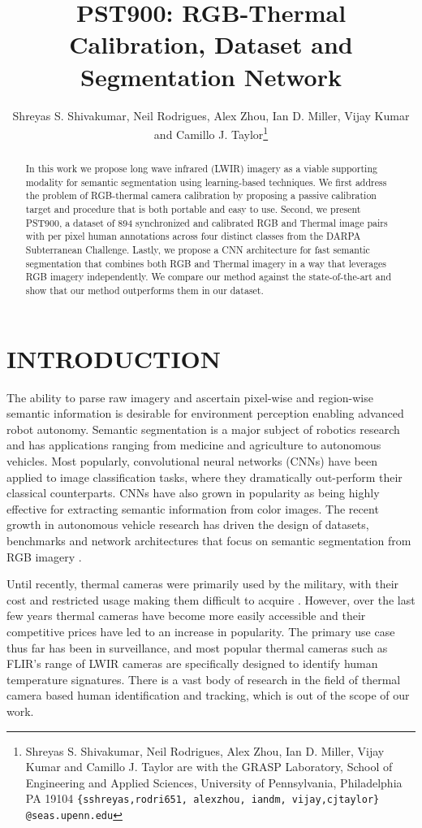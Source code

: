 \documentclass[letterpaper, 10 pt, conference]{ieeeconf}
\title{\LARGE \bf
PST900: RGB-Thermal Calibration, Dataset and Segmentation Network 
}
\author{Shreyas S. Shivakumar, Neil Rodrigues, Alex Zhou, Ian D. Miller, Vijay Kumar and Camillo J. Taylor\thanks{Shreyas S. Shivakumar, Neil Rodrigues, Alex Zhou, Ian D. Miller, Vijay Kumar and Camillo J. Taylor are with the GRASP Laboratory, School of Engineering and Applied Sciences,
        University of Pennsylvania, Philadelphia PA 19104
        {\tt\small \{sshreyas,rodri651, alexzhou, iandm, vijay,cjtaylor\}
        @seas.upenn.edu}}}
\begin{document}
\maketitle
\thispagestyle{empty}
\pagestyle{empty}


\begin{abstract}

In this work we propose long wave infrared (LWIR) imagery as a viable supporting modality for semantic segmentation using learning-based techniques. We first address the problem of RGB-thermal camera calibration by proposing a passive calibration target and procedure that is both portable and easy to use. Second, we present PST900, a dataset of 894 synchronized and calibrated RGB and Thermal image pairs with per pixel human annotations across four distinct classes from the DARPA Subterranean Challenge. Lastly, we propose a CNN architecture for fast semantic segmentation that combines both RGB and Thermal imagery in a way that leverages RGB imagery independently. We compare our method against the state-of-the-art and show that our method outperforms them in our dataset. 

\end{abstract}


\section{INTRODUCTION}

The ability to parse raw imagery and ascertain pixel-wise and region-wise semantic information is desirable for environment perception enabling advanced robot autonomy. Semantic segmentation is a major subject of robotics research and has applications ranging from medicine \cite{ronneberger2015u} and agriculture \cite{chen2017counting} to autonomous vehicles. Most popularly, convolutional neural networks (CNNs) have been applied to image classification tasks, where they dramatically out-perform their classical counterparts. CNNs have also grown in popularity as being highly effective for extracting semantic information from color images. The recent growth in autonomous vehicle research has driven the design of datasets, benchmarks and network architectures that focus on semantic segmentation from RGB imagery \cite{cordts2016cityscapes,zhou2017scene,alhaija2018augmented,lin2014microsoft,everingham2010pascal}.

Until recently, thermal cameras were primarily used by the military, with their cost and restricted usage making them difficult to acquire \cite{vollmer2017infrared}. However, over the last few years thermal cameras have become more easily accessible and their competitive prices have led to an increase in popularity. The primary use case thus far has been in surveillance, and most popular thermal cameras such as FLIR's range of LWIR cameras are specifically designed to identify human temperature signatures. There is a vast body of research in the field of thermal camera based human identification and tracking, which is out of the scope of our work.
\end{document}
